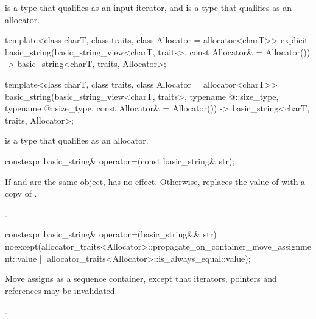 \begin{itemdescr}
\pnum
\constraints
{} is a type that qualifies as an input iterator,
and  is a type that qualifies as an allocator.
\end{itemdescr}

\begin{itemdecl}
template<class charT,
         class traits,
         class Allocator = allocator<charT>>
  explicit basic_string(basic_string_view<charT, traits>, const Allocator& = Allocator())
    -> basic_string<charT, traits, Allocator>;

template<class charT,
         class traits,
         class Allocator = allocator<charT>>
  basic_string(basic_string_view<charT, traits>,
               typename @\seebelow@::size_type, typename @\seebelow@::size_type,
               const Allocator& = Allocator())
    -> basic_string<charT, traits, Allocator>;
\end{itemdecl}

\begin{itemdescr}
\pnum
\constraints
{} is a type that qualifies as
an allocator.
\end{itemdescr}

%
\begin{itemdecl}
constexpr basic_string& operator=(const basic_string& str);
\end{itemdecl}

\begin{itemdescr}
\pnum
\effects
If  and  are the same object, has no effect.
Otherwise, replaces the value of  with a copy of .

\pnum
\returns
{}.
\end{itemdescr}

%
\begin{itemdecl}
constexpr basic_string& operator=(basic_string&& str)
  noexcept(allocator_traits<Allocator>::propagate_on_container_move_assignment::value ||
           allocator_traits<Allocator>::is_always_equal::value);
\end{itemdecl}

\begin{itemdescr}
\pnum
\effects
Move assigns as a sequence container,
except that iterators, pointers and references may be invalidated.

\pnum
\returns
{}.
\end{itemdescr}

